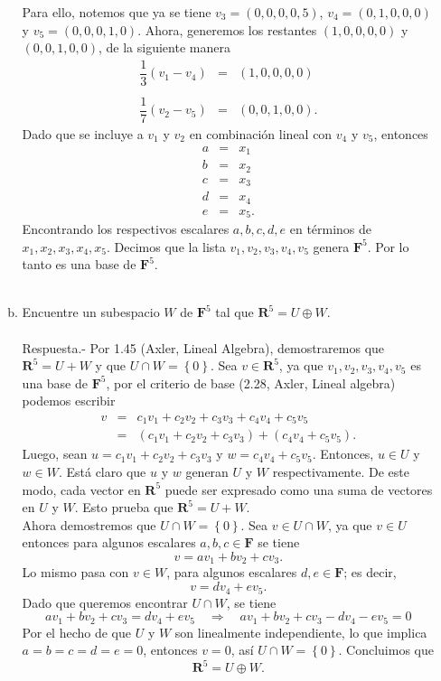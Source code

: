 \begin{enumerate}[\bfseries 1.]
\begin{enumerate}[a).]
		Para ello, notemos que ya se tiene $v_3=(0,0,0,0,5)$, $v_4=(0,1,0,0,0)$ y $v_5=(0,0,0,1,0)$. Ahora, generemos los restantes $(1,0,0,0,0)$ y $(0,0,1,0,0)$, de la siguiente manera 
		$$
		\begin{array}{rcl}
		    \dfrac{1}{3}(v_1-v_4)&=&(1,0,0,0,0)\\\\
		    \dfrac{1}{7}(v_2-v_5)&=&(0,0,1,0,0).
		\end{array}
		$$
		Dado que se incluye a $v_1$ y $v_2$ en combinación lineal con $v_4$ y $v_5$, entonces 
		$$
		\begin{array}{rcl}
		    a&=&x_1\\
		    b&=&x_2\\
		    c&=&x_3\\
		    d&=&x_4\\
		    e&=&x_5.
		\end{array}
		$$
		Encontrando los respectivos escalares $a,b,c,d,e$ en términos de $x_1,x_2,x_3,x_4,x_5$. Decimos que la lista $v_1,v_2,v_3,v_4,v_5$ genera $\textbf{F}^5$. Por lo tanto es una base de $\textbf{F}^5$.\\\\
		    


	    \item Encuentre un subespacio $W$ de $\textbf{F}^5$ tal que $\textbf{R}^5=U\oplus W$.\\\\
		Respuesta.- Por 1.45 (Axler, Lineal Algebra), demostraremos que $\textbf{R}^5=U+W$ y que $U\cap W=\left\{0\right\}$. Sea $v\in \textbf{R}^5$, ya que $v_1,v_2,v_3,v_4,v_5$ es una base de $\textbf{F}^5$, por el criterio de base (2.28, Axler, Lineal algebra) podemos escribir 
		$$
		\begin{array}{rcl}
		    v &=& c_1v_1+c_2v_2+c_3v_3+c_4v_4+c_5v_5\\
		      &=&(c_1v_1+c_2v_2+c_3v_3)+(c_4v_4+c_5v_5).
		\end{array}
		$$
		Luego, sean $u=c_1v_1+c_2v_2+c_3v_3$ y $w=c_4v_4+c_5v_5$. Entonces, $u\in U$ y $w\in W$. Está claro que $u$ y $w$ generan $U$ y $W$ respectivamente. De este modo, cada vector en $\textbf{R}^5$ puede ser expresado como una suma de vectores en $U$ y $W$. Esto prueba que $\textbf{R}^5=U+W$.\\

		Ahora demostremos que $U\cap W=\left\{0\right\}$. Sea $v\in U\cap W$, ya que $v\in U$ entonces para algunos escalares $a,b,c\in \textbf{F}$ se tiene
		$$v=av_1+bv_2+cv_3.$$
		Lo mismo pasa con $v\in W$, para algunos escalares $d,e\in \textbf{F}$; es decir,
		$$v=dv_4+ev_5.$$
		Dado que queremos encontrar $U\cap W$, se tiene
		$$av_1+bv_2+cv_3=dv_4+ev_5 \quad \Rightarrow \quad av_1+bv_2+cv_3-dv_4-ev_5=0$$
		Por el hecho de que $U$ y $W$ son linealmente independiente, lo que implica $a=b=c=d=e=0$, entonces $v=0$, así $U\cap W = \left\{0\right\}$. Concluimos que 
		$$\textbf{R}^5=U\oplus W.$$\\


\end{enumerate}
\end{enumerate}
